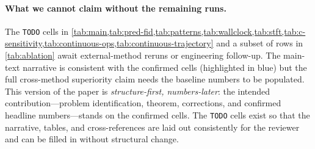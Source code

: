 \documentclass{article}
\theoremstyle{plain}
\theoremstyle{definition}
\theoremstyle{remark}
\begin{document}
\paragraph{What we cannot claim without the remaining runs.}
The \texttt{TODO} cells in \cref{tab:main,tab:pred-fid,tab:patterns,tab:wallclock,tab:stft,tab:c-sensitivity,tab:continuous-ops,tab:continuous-trajectory} and a subset of rows in \cref{tab:ablation} await external-method reruns or engineering follow-up. The main-text narrative is consistent with the confirmed cells (highlighted in blue) but the full cross-method superiority claim needs the baseline numbers to be populated. This version of the paper is \emph{structure-first, numbers-later}: the intended contribution---problem identification, theorem, corrections, and confirmed headline numbers---stands on the confirmed cells. The \texttt{TODO} cells exist so that the narrative, tables, and cross-references are laid out consistently for the reviewer and can be filled in without structural change.

\newpage

\end{document}
